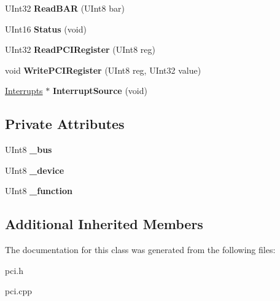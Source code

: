 \begin{DoxyCompactItemize}
\item 
\mbox{\label{class_p_c_i_1_1_device_a4b8d0c211e4b8722397574408ad93bc6}} 
U\+Int32 {\bfseries Read\+B\+AR} (U\+Int8 bar)
\item 
\mbox{\label{class_p_c_i_1_1_device_acb6992e4a37c36efdda5d7f2de916166}} 
U\+Int16 {\bfseries Status} (void)
\item 
\mbox{\label{class_p_c_i_1_1_device_abac79f8a35c4cec8aae8fa0ab060baf9}} 
U\+Int32 {\bfseries Read\+P\+C\+I\+Register} (U\+Int8 reg)
\item 
\mbox{\label{class_p_c_i_1_1_device_a106d53580b7102da5e38e578ae7af00c}} 
void {\bfseries Write\+P\+C\+I\+Register} (U\+Int8 reg, U\+Int32 value)
\item 
\mbox{\label{class_p_c_i_1_1_device_a323b4199e204596a1b35e83e6aa539b4}} 
\hyperlink{class_interrupts}{Interrupts} $\ast$ {\bfseries Interrupt\+Source} (void)
\end{DoxyCompactItemize}
\subsection*{Private Attributes}
\begin{DoxyCompactItemize}
\item 
\mbox{\label{class_p_c_i_1_1_device_a9b6471f14a9232bf92dba05df8cc4b2e}} 
U\+Int8 {\bfseries \+\_\+bus}
\item 
\mbox{\label{class_p_c_i_1_1_device_a6ed31c0a3f573f63db71619c804212d5}} 
U\+Int8 {\bfseries \+\_\+device}
\item 
\mbox{\label{class_p_c_i_1_1_device_a4f27b1199ccddbe3bb3cb08df70c7267}} 
U\+Int8 {\bfseries \+\_\+function}
\end{DoxyCompactItemize}
\subsection*{Additional Inherited Members}


The documentation for this class was generated from the following files\+:\begin{DoxyCompactItemize}
\item 
pci.\+h\item 
pci.\+cpp\end{DoxyCompactItemize}
